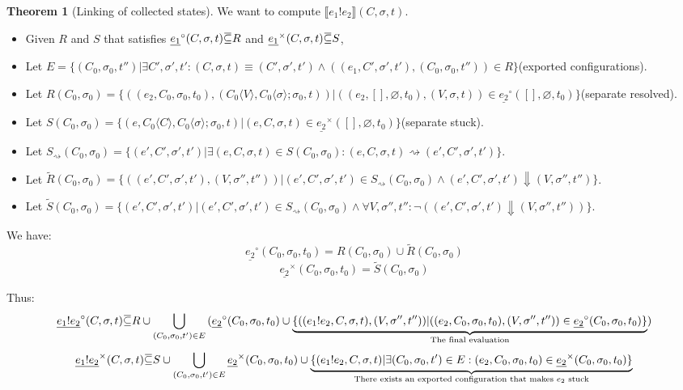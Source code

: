 \documentclass{article}
\theoremstyle{definition}
\newtheorem{thm}{Theorem}[section]
\newcommand{\loverbar}[1]{\mkern 1.5mu\overline{\mkern-1.5mu#1\mkern-1.5mu}\mkern 1.5mu}
\newcommand*{\link}[2]{{#1}\mathtt{!}{#2}}
\newcommand*{\Stuck}[1]{\underline{#1}^{\times}}
\newcommand*{\Resolved}[1]{\underline{#1}^{\circ}}
\newcommand*{\sembracket}[1]{\lBrack{#1}\rBrack}
\newcommand*{\inject}[2]{{#1}\langle{#2}\rangle}
\begin{document}
\begin{thm}[Linking of collected states] We want to compute $\sembracket{\link{e_{1}}{e_{2}}}(C,\sigma,t)$.
  $\:$

  \begin{itemize}
    \item Given $R$ and $S$ that satisfies $\Resolved{e_{1}}(C,\sigma,t)\loverbar{\subseteq} R$ and $\Stuck{e_{1}}(C,\sigma,t)\loverbar{\subseteq} S$,
    \item Let $E=\{(C_{0},\sigma_{0},t'')|\exists C',\sigma',t':(C,\sigma,t)\equiv(C',\sigma',t')\wedge((e_{1},C',\sigma',t'),(C_{0},\sigma_{0},t''))\in R\}$(exported configurations).
    \item Let $R(C_{0},\sigma_{0})=\{((e_{2},C_{0},\sigma_{0},t_{0}), (\inject{C_{0}}{V},\inject{C_{0}}{\sigma};\sigma_{0},t))|((e_{2},[],\varnothing,t_{0}),(V,\sigma,t))\in\Resolved{e_{2}}([],\varnothing,t_{0})\}$(separate resolved).
    \item Let $S(C_{0},\sigma_{0})=\{(e,\inject{C_{0}}{C},\inject{C_{0}}{\sigma};\sigma_{0},t)|(e,C,\sigma,t)\in\Stuck{e_{2}}([],\varnothing,t_{0})\}$(separate stuck).
    \item Let ${S}_{\rightsquigarrow}(C_{0},\sigma_{0})=\{(e',C',\sigma',t')|\exists(e,C,\sigma,t)\in S(C_{0},\sigma_{0}):(e,C,\sigma,t)\rightsquigarrow(e',C',\sigma',t')\}$.
    \item Let $\tilde{R}(C_{0},\sigma_{0})=\{((e',C',\sigma',t'), (V,\sigma'',t''))|(e',C',\sigma',t')\in{S}_{\rightsquigarrow}(C_{0},\sigma_{0})\wedge(e',C',\sigma',t')\Downarrow(V,\sigma'',t'')\}$.
    \item Let $\tilde{S}(C_{0},\sigma_{0})=\{(e',C',\sigma',t')|(e',C',\sigma',t')\in S_{\rightsquigarrow}(C_{0},\sigma_{0})\wedge\forall V,\sigma'',t'':\lnot((e',C',\sigma',t')\Downarrow(V,\sigma'',t''))\}$.
  \end{itemize}

  We have:
  \[
    \Resolved{e_{2}}(C_{0},\sigma_{0},t_{0})=R(C_{0},\sigma_{0})\cup\tilde{R}(C_{0},\sigma_{0})
  \]
  \[
    \Stuck{e_{2}}(C_{0},\sigma_{0},t_{0})=\tilde{S}(C_{0},\sigma_{0})
  \]

  Thus:
  \[
    \Resolved{\link{e_1}{e_2}}(C,\sigma,t)\loverbar{\subseteq}
    R\cup\bigcup_{(C_{0},\sigma_{0},t')\in E}{(\Resolved{e_2}(C_{0},\sigma_{0},t_{0})\cup\underbrace{\{((\link{e_1}{e_2}, C, \sigma, t), (V,\sigma'',t''))|((e_{2},C_{0},\sigma_{0},t_{0}),(V,\sigma'',t''))\in\Resolved{e_{2}}(C_{0},\sigma_{0},t_{0})\}}_{\text{The final evaluation}})}
  \]
  \[
    \Stuck{\link{e_1}{e_2}}(C,\sigma,t)\loverbar{\subseteq}S\cup\bigcup_{(C_{0},\sigma_{0},t')\in E}{\Stuck{e_2}(C_{0},\sigma_{0},t_{0})}\cup \underbrace{\{(\link{e_1}{e_2}, C, \sigma, t)|\exists (C_{0},\sigma_{0},t')\in E:(e_{2},C_{0},\sigma_{0},t_{0})\in\Stuck{e_{2}}(C_{0},\sigma_{0},t_{0})\}}_{\text{There exists an exported configuration that makes }e_{2}\text{ stuck}}
  \]
\end{thm}
\end{document}
